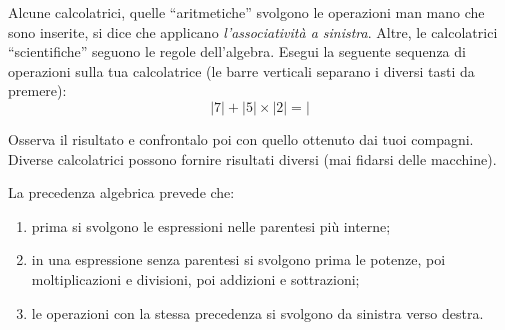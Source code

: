 
\begin{osservazione}{}{} 
Alcune calcolatrici, quelle ``aritmetiche'' svolgono le 
operazioni man mano che sono inserite, si dice che applicano 
\emph{l'associatività a sinistra}. Altre, le calcolatrici ``scientifiche'' 
seguono le regole dell'algebra. Esegui la seguente sequenza di operazioni 
sulla tua calcolatrice 
(le barre verticali separano i diversi tasti da premere):
\[|7|+|5|\times|2|=|\]
\end{osservazione}

Osserva il risultato e confrontalo poi con quello ottenuto dai tuoi 
compagni. 
Diverse calcolatrici possono fornire risultati diversi (mai fidarsi delle
macchine).

La precedenza algebrica prevede che:

\begin{enumerate} [nosep]
 \item prima si svolgono le espressioni nelle parentesi più interne; 
 \item in una espressione senza parentesi si svolgono prima le potenze, 
  poi moltiplicazioni e divisioni, poi addizioni e sottrazioni;
 \item le operazioni con la stessa precedenza si svolgono da sinistra verso 
  destra.
\end{enumerate}

